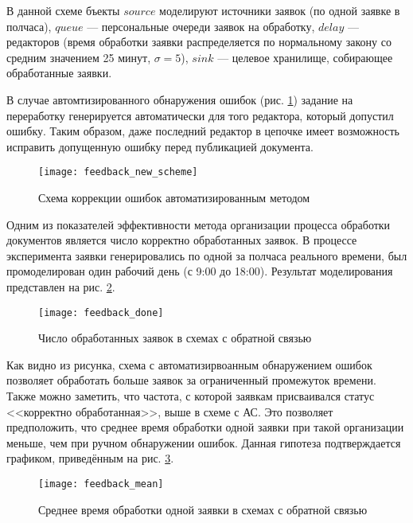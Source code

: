 \vspace{\baselineskip}
В данной схеме бъекты $source$ моделируют источники заявок (по одной заявке в полчаса), $queue$ --- персональные очереди заявок на обработку, $delay$ --- редакторов (время обработки заявки распределяется по нормальному закону со средним значением 25 минут, $\sigma=5$), $sink$ --- целевое хранилище, собирающее обработанные заявки.

\vspace{\baselineskip}
В случае автомтизированного обнаружения ошибок (рис. \ref{img:feedback_new_scheme}) задание на переработку генерируется автоматически для того редактора, который допустил ошибку. Таким образом, даже последний редактор в цепочке имеет возможность исправить допущенную ошибку перед публикацией документа.

\begin{figure}[h!]
  \centering
  \texttt{[image: feedback\_new\_scheme]}
  \caption{Схема коррекции ошибок автоматизированным методом}
  \label{img:feedback_new_scheme}
\end{figure}

\vspace{\baselineskip}
Одним из показателей эффективности метода организации процесса обработки документов является число корректно обработанных заявок. В процессе эксперимента заявки генерировались по одной за полчаса реального времени, был промоделирован один рабочий день (с 9:00 до 18:00). Результат моделирования представлен на рис. \ref{img:feedback_done}.

\begin{figure}[h!]
  \centering
  \texttt{[image: feedback\_done]}
  \caption{Число обработанных заявок в схемах с обратной связью}
  \label{img:feedback_done}
\end{figure}

\vspace{\baselineskip}
Как видно из рисунка, схема с автоматизирвоанным обнаружением ошибок позволяет обработать больше заявок за ограниченный промежуток времени. Также можно заметить, что частота, с которой заявкам присваивался статус <<корректно обработанная>>, выше в схеме с АС. Это позволяет предположить, что среднее время обработки одной заявки при такой организации меньше, чем при ручном обнаружении ошибок. Данная гипотеза подтверждается графиком, приведённым на рис. \ref{img:feedback_mean}.

\begin{figure}[h!]
  \centering
  \texttt{[image: feedback\_mean]}
  \caption{Среднее время обработки одной заявки в схемах с обратной связью}
  \label{img:feedback_mean}
\end{figure}

